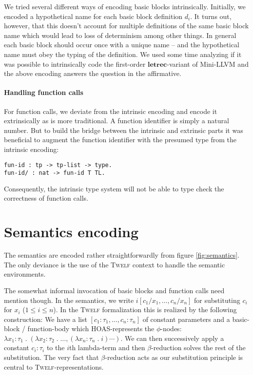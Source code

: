 \documentclass[a4paper, oneside, 10pt, draft]{memoir}
\newcommand{\twelf}{\textsc{Twelf}}
\begin{document}
We tried several different ways of encoding basic blocks
intrinsically. Initially, we encoded a hypothetical name for
each basic block definition $d_i$. It turns out, however, that this
doesn't account for multiple definitions of the same basic block
name which would lead to loss of determinism among other
things. In general each basic block should occur once with a unique
name -- and the hypothetical name must obey the typing of the
definition. We used some time analyzing if it was possible to
intrinsically code the first-order $\mathbf{letrec}$-variant of
Mini-LLVM and the above encoding answers the question in the
affirmative.

\paragraph{Handling function calls}

For function calls, we deviate from the intrinsic encoding and encode
it extrinsically as is more traditional. A function identifier is
simply a natural number. But to build the bridge between the intrinsic
and extrinsic parts it was beneficial to augment the function
identifier with the presumed type from the intrinsic encoding:
\begin{verbatim}
fun-id : tp -> tp-list -> type.
fun-id/ : nat -> fun-id T TL.
\end{verbatim}
Consequently, the intrinsic type system will not be able to type check
the correctness of function calls.

\section{Semantics encoding}

The semantics are encoded rather straightforwardly from figure
\ref{fig:semantics}. The only deviance is the use of the \twelf{}
context to handle the semantic environments.

The somewhat informal invocation of basic blocks and function calls
need mention though. In the semantics, we write $i[c_1/x_1, \dotsc,
c_n/x_n]$ for substituting $c_i$ for $x_i$ ($1 \leq i \leq n$). In the
\twelf{} formalization this is realized by the following construction:
We have a list $[c_1 : \tau_1, \dotsc, c_n : \tau_n]$ of constant
parameters and a basic-block / function-body which HOAS-represents the
$\phi$-nodes: $\lambda x_1 : \tau_1 \;.\; (\lambda x_2 : \tau_2 \;.\;
\dotsc, (\lambda x_n : \tau_n \;.\; i)\dotsb{})$. We can then
successively apply a constant $c_i : \tau_i$ to the $i$th lambda-term
and then $\beta$-reduction solves the rest of the substitution. The
very fact that $\beta$-reduction acts as our substitution principle is
central to \twelf{}-representations.
\end{document}
